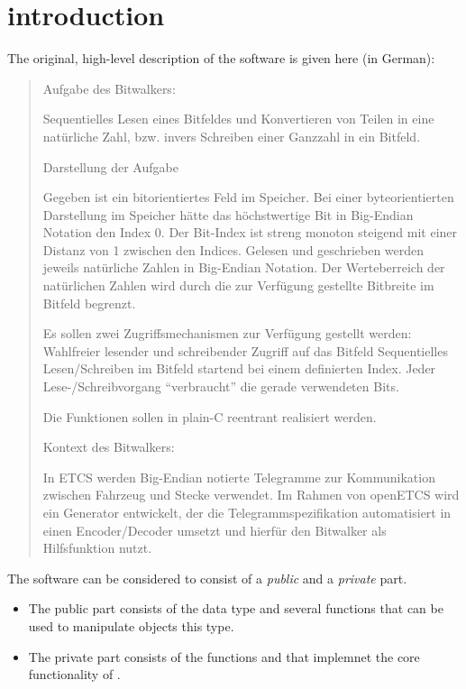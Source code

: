 \section{introduction}

The original, high-level description of the \bitwalker software is given here (in German):


\begin{quote}
 
Aufgabe des Bitwalkers:
 
Sequentielles Lesen eines Bitfeldes und Konvertieren von Teilen in eine natürliche Zahl,
bzw. invers Schreiben einer Ganzzahl in ein Bitfeld.
 
Darstellung der Aufgabe
 
Gegeben ist ein bitorientiertes Feld im Speicher.
Bei einer byteorientierten Darstellung im Speicher hätte das höchstwertige Bit
in Big-Endian Notation den Index 0.
Der Bit-Index ist streng monoton steigend mit einer Distanz von 1 zwischen den Indices.
Gelesen und geschrieben werden jeweils natürliche Zahlen in Big-Endian Notation.
Der Werteberreich der natürlichen Zahlen wird durch die zur Verfügung gestellte Bitbreite
im Bitfeld begrenzt.
 
Es sollen zwei Zugriffsmechanismen zur Verfügung gestellt werden:
Wahlfreier lesender und schreibender Zugriff auf das Bitfeld
Sequentielles Lesen/Schreiben im Bitfeld startend bei einem definierten Index.
Jeder Lese-/Schreibvorgang ``verbraucht'' die gerade verwendeten Bits.
 
Die Funktionen sollen in plain-C reentrant realisiert werden.
 
Kontext des Bitwalkers:
 
In ETCS werden Big-Endian notierte Telegramme zur Kommunikation zwischen Fahrzeug und
Stecke verwendet.
Im Rahmen von openETCS wird ein Generator entwickelt,
der die Telegrammspezifikation automatisiert in einen
Encoder/Decoder umsetzt und hierfür den Bitwalker als Hilfsfunktion nutzt.
\end{quote}





The \bitwalker software can be considered to consist of a \emph{public}
and a \emph{private} part.
\begin{itemize}
\item
The public part consists of the \isoc data type \bitwalkertype and several \isoc functions
that can be used to manipulate objects this type.

\item
The private part consists of the functions \peek and \poke
that implemnet the core functionality of \bitwalker.
\end{itemize}

